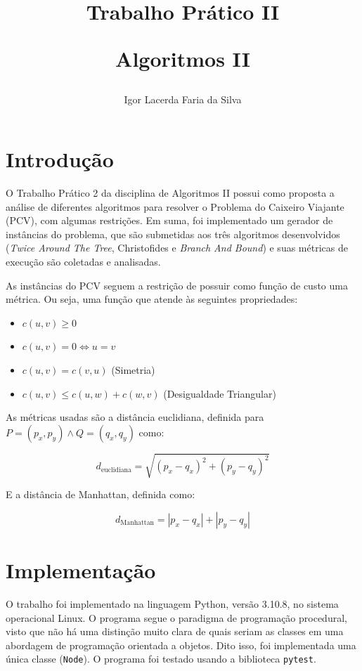 \documentclass{article}
\author{Igor Lacerda Faria da Silva}
\title{Trabalho Prático II

Algoritmos II}
\date{}
\begin{document}
\maketitle

\section{Introdução}

O Trabalho Prático 2 da disciplina de Algoritmos II possui como proposta a análise de diferentes algoritmos para resolver o Problema do Caixeiro Viajante (PCV), com algumas restrições. Em suma, foi implementado um gerador de instâncias do problema, que são submetidas aos três algoritmos desenvolvidos (\textit{Twice Around The Tree}, Christofides e \textit{Branch And Bound}) e suas métricas de execução são coletadas e analisadas.

As instâncias do PCV seguem a restrição de possuir como função de custo uma métrica. Ou seja, uma função que atende às seguintes propriedades:
\begin{itemize}

	\item \( c(u,v) \geq 0 \)

	\item \( c(u,v) = 0  \Leftrightarrow  u = v \)

	\item \( c(u,v) = c(v,u) \) (Simetria)

	\item \( c(u,v) \leq c(u,w) + c(w,v) \) (Desigualdade Triangular)

\end{itemize}

As métricas usadas são a distância euclidiana, definida para \( P = (p_x,p_y) \land Q=(q_x,q_y) \) como:

\[ d_{\textrm{euclidiana}} = \sqrt{ (p_x-q_x)^{2} + (p_y-q_y)^2 } \]

E a distância de Manhattan, definida como:

\[ d_{\textrm{Manhattan}} = | p_x - q_x | + | p_y - q_y | \]


\section{Implementação}

O trabalho foi implementado na linguagem Python, versão 3.10.8, no sistema operacional Linux. O programa segue o paradigma de programação procedural, visto que não há uma distinção muito clara de quais seriam as classes em uma abordagem de programação orientada a objetos. Dito isso, foi implementada uma única classe (\texttt{Node}). O programa foi testado usando a biblioteca \texttt{pytest}.
\end{document}
